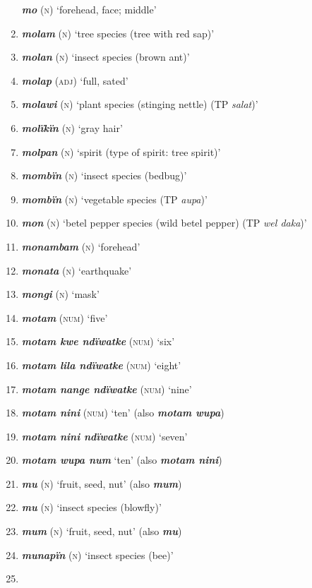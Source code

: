 \begin{enumerate}[noitemsep, label={}, align=left, widest=190, labelsep=1ex,leftmargin=*,itemindent=-10pt]
\textbf{\textit{mo}} (\textsc{n}) ‘forehead, face; middle’ \item
\textbf{\textit{molam}} (\textsc{n}) ‘tree species (tree with red sap)’ \item
\textbf{\textit{molan}} (\textsc{n}) ‘insect species (brown ant)’ \item
\textbf{\textit{molap}} (\textsc{adj}) ‘full, sated’ \item
\textbf{\textit{molawi}} (\textsc{n}) ‘plant species (stinging nettle) (TP \textit{salat})’ \item
\textbf{\textit{molïkïn}} (\textsc{n}) ‘gray hair’ \item
\textbf{\textit{molpan}} (\textsc{n}) ‘spirit (type of spirit: tree spirit)’ \item
\textbf{\textit{mombïn}} (\textsc{n}) ‘insect species (bedbug)’ \item
\textbf{\textit{mombïn}} (\textsc{n}) ‘vegetable species (TP \textit{aupa})’ \item
\textbf{\textit{mon}} (\textsc{n}) ‘betel pepper species (wild betel pepper) (TP \textit{wel daka})’ \item
\textbf{\textit{monambam}} (\textsc{n}) ‘forehead’ \item
\textbf{\textit{monata}} (\textsc{n}) ‘earthquake’ \item
\textbf{\textit{mongi}} (\textsc{n}) ‘mask’ \item
\textbf{\textit{motam}} (\textsc{num}) ‘five’ \item
\textbf{\textit{motam kwe ndïwatke}} (\textsc{num}) ‘six’ \item
\textbf{\textit{motam lila ndïwatke}} (\textsc{num}) ‘eight’ \item
\textbf{\textit{motam nange ndïwatke}} (\textsc{num}) ‘nine’ \item
\textbf{\textit{motam nini}} (\textsc{num}) ‘ten’ (also \textbf{\textit{motam wupa}}) \item
\textbf{\textit{motam nini ndïwatke}} (\textsc{num}) ‘seven’ \item
\textbf{\textit{motam wupa num}} ‘ten’ (also \textbf{\textit{motam nini}}) \item
\textbf{\textit{mu}} (\textsc{n}) ‘fruit, seed, nut’ (also \textbf{\textit{mum}}) \item
\textbf{\textit{mu}} (\textsc{n}) ‘insect species (blowfly)’ \item
\textbf{\textit{mum}} (\textsc{n}) ‘fruit, seed, nut’ (also \textbf{\textit{mu}}) \item
\textbf{\textit{munapïn}} (\textsc{n}) ‘insect species (bee)’ \item

\end{enumerate}
